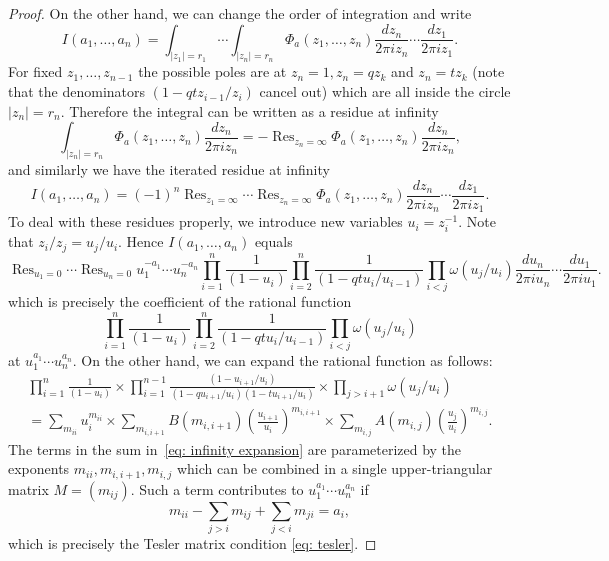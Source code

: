 \documentclass[11pt,reqno]{amsart}
\theoremstyle{definition}
\numberwithin{equation}{section}
\DeclareMathOperator{\Res}{Res}
\begin{document}
\begin{proof}
On the other hand, we can change the order of integration and write
\[
	I(a_1,\ldots,a_n)=
	\int_{|z_1|=r_1}\cdots \int_{|z_n|=r_n} \Phi_a(z_1,\ldots,z_n) \frac{dz_n}{2\pi iz_n}\cdots \frac{dz_1}{2\pi iz_1}.
\]
For fixed $z_1,\ldots,z_{n-1}$ the possible poles are at $z_n=1,z_n=qz_k$ and $z_n=tz_k$ (note that the denominators
$(1-qt z_{i-1}/z_i)$ cancel out) which are all inside the circle $|z_n|=r_n$. Therefore the integral can be written as a residue
at infinity
\[
	\int_{|z_n|=r_n} \Phi_a(z_1,\ldots,z_n) \frac{dz_n}{2\pi iz_n}=-\Res_{z_n=\infty}\Phi_a(z_1,\ldots,z_n) \frac{dz_n}{2\pi iz_n},
\]
and similarly we have the iterated residue at infinity
\[
	I(a_1,\ldots,a_n)=(-1)^{n}\Res_{z_1=\infty}\cdots \Res_{z_n=\infty} \Phi_a(z_1,\ldots,z_n) 
	\frac{dz_n}{2\pi iz_n}\cdots \frac{dz_1}{2\pi iz_1}.
\]
To deal with these residues properly, we introduce new variables $u_i=z_i^{-1}$. Note that $z_i/z_j=u_j/u_i$. 
Hence $I(a_1,\ldots,a_n)$ equals
\[
	\Res_{u_1=0}\cdots \Res_{u_n=0} u_1^{-a_1}\cdots u_n^{-a_n}
	\prod_{i=1}^{n}\frac{1}{(1-u_i)}\prod_{i=2}^{n}\frac{1}{(1-qtu_{i}/u_{i-1})}
	\prod_{i<j}\omega(u_j/u_i)\frac{du_n}{2\pi iu_n}\cdots \frac{du_1}{2\pi iu_1}.
\]
which is precisely the coefficient of the rational function
\[
	\prod_{i=1}^{n}\frac{1}{(1-u_i)} \prod_{i=2}^{n}\frac{1}{(1-qtu_{i}/u_{i-1})}\prod_{i<j}\omega(u_j/u_i)
\]
at $u_1^{a_1}\cdots u_n^{a_n}$. On the other hand, we can expand the rational function as follows:
\begin{multline}
	\prod_{i=1}^{n}\frac{1}{(1-u_i)}\times \prod_{i=1}^{n-1}\frac{(1-u_{i+1}/u_{i})}{(1-qu_{i+1}/u_{i})(1-tu_{i+1}/u_{i})}\times
	\prod_{j>i+1}\omega(u_j/u_i)\\
	=\sum_{m_{ii}}u_i^{m_{ii}}\times \sum_{m_{i,i+1}}B(m_{i,i+1})\left(\frac{u_{i+1}}{u_{i}}\right)^{m_{i,i+1}}\times 
	\sum_{m_{i,j}}A(m_{i,j})\left(\frac{u_j}{u_{i}}\right)^{m_{i,j}}.
\label{eq: infinity expansion}
\end{multline}
The terms in the sum in~\eqref{eq: infinity expansion} are parameterized by the exponents $m_{ii},m_{i,i+1},m_{i,j}$ 
which can be combined in a single upper-triangular matrix $M=(m_{ij})$. Such a term contributes to 
$u_1^{a_1}\cdots u_n^{a_n}$ if
\[
	m_{ii}-\sum_{j>i}m_{ij}+\sum_{j<i}m_{ji}=a_i,
\]
which is precisely the Tesler matrix condition \eqref{eq: tesler}.
\end{proof}
\end{document}
